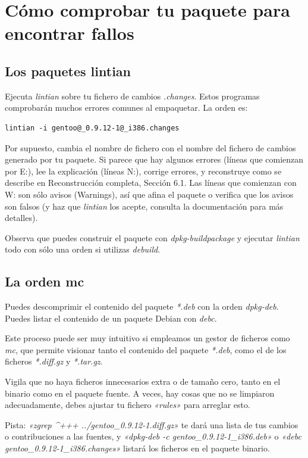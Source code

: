 \documentclass[letterpaper,12pt,spanish]{manual}
\begin{document}
\section{\textbf{Cómo comprobar tu paquete para encontrar fallos}}


\subsection{Los paquetes lintian}

Ejecuta \emph{lintian} sobre tu fichero de cambios \emph{.changes}. Estos programas comprobarán muchos errores comunes al empaquetar. La orden es:

\begin{Verbatim}[commandchars=@\[\]]
lintian -i gentoo@_0.9.12-1@_i386.changes
\end{Verbatim}

Por supuesto, cambia el nombre de fichero con el nombre del fichero de cambios generado por tu paquete. Si parece que hay algunos errores (líneas que comienzan por E:), lee la explicación (líneas N:), corrige errores, y reconstruye como se describe en Reconstrucción completa, Sección 6.1. Las líneas que comienzan con W: son sólo avisos (Warnings), así que afina el paquete o verifica que los avisos son falsos (y haz que \emph{lintian} los acepte, consulta la documentación para más detalles).

Observa que puedes construir el paquete con \emph{dpkg-buildpackage} y ejecutar \emph{lintian} todo con sólo una orden si utilizas \emph{debuild}.


\subsection{La orden mc}

Puedes descomprimir el contenido del paquete \emph{*.deb} con la orden \emph{dpkg-deb}. Puedes listar el contenido de un paquete Debian con \emph{debc}.

Este proceso puede ser muy intuitivo si empleamos un gestor de ficheros como \emph{mc}, que permite visionar tanto el contenido del paquete \emph{*.deb}, como el de los ficheros \emph{*.diff.gz} y \emph{*.tar.gz}.

Vigila que no haya ficheros innecesarios extra o de tamaño cero, tanto en el binario como en el paquete fuente. A veces, hay cosas que no se limpiaron adecuadamente, debes ajustar tu fichero \emph{«rules»} para arreglar esto.

Pista: \emph{«zgrep \textasciicircum{}+++ ../gentoo\_0.9.12-1.diff.gz»} te dará una lista de tus cambios o contribuciones a las fuentes, y \emph{«dpkg-deb -c gentoo\_0.9.12-1\_i386.deb»} o \emph{«debc gentoo\_0.9.12-1\_i386.changes»} listará los ficheros en el paquete binario.
\end{document}
